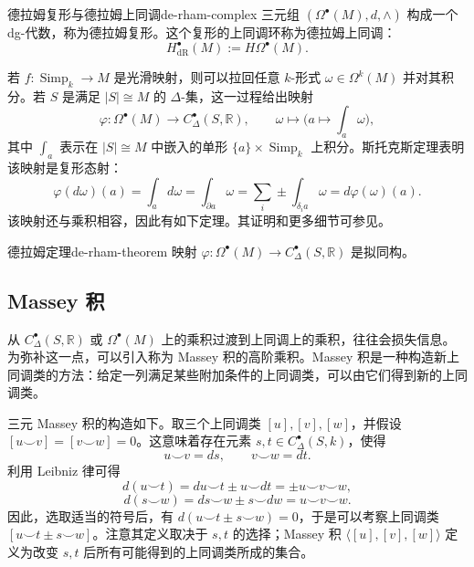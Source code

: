 \begin{definition}{德拉姆复形与德拉姆上同调}{de-rham-complex}
三元组 $(\Omega^\bullet(M),d,\wedge)$ 构成一个 dg-代数，称为德拉姆复形。这个复形的上同调环称为德拉姆上同调：
\[
  H_{\mathrm{dR}}^\bullet(M):=H\Omega^\bullet(M).
\]
\end{definition}
若 $f\colon\operatorname{Simp}_k\to M$ 是光滑映射，则可以拉回任意 $k$-形式 $\omega\in\Omega^k(M)$ 并对其积分。若 $S$ 是满足 $|S|\cong M$ 的 $\Delta$-集，这一过程给出映射
\[
  \varphi\colon\Omega^\bullet(M)\longrightarrow C_\Delta^\bullet(S,\mathbb R),
  \qquad \omega\longmapsto\bigl(a\longmapsto\int_a\omega\bigr),
\]
其中 $\int_a$ 表示在 $|S|\cong M$ 中嵌入的单形 $\{a\}\times\operatorname{Simp}_k$ 上积分。斯托克斯定理表明该映射是复形态射：
\[
  \varphi(d\omega)(a)=\int_a d\omega
  =\int_{\partial a}\omega
  =\sum_i\pm\int_{\delta_i a}\omega
  =d\varphi(\omega)(a).
\]
该映射还与乘积相容，因此有如下定理。其证明和更多细节可参见。

\begin{theorem}{德拉姆定理}{de-rham-theorem}
映射 $\varphi\colon\Omega^\bullet(M)\to C_\Delta^\bullet(S,\mathbb R)$ 是拟同构。
\end{theorem}

\subsection{Massey 积}\label{subsec:massey-products}
从 $C_\Delta^\bullet(S,\mathbb R)$ 或 $\Omega^\bullet(M)$ 上的乘积过渡到上同调上的乘积，往往会损失信息。为弥补这一点，可以引入称为 Massey 积的高阶乘积。Massey 积是一种构造新上同调类的方法：给定一列满足某些附加条件的上同调类，可以由它们得到新的上同调类。

三元 Massey 积的构造如下。取三个上同调类 $[u],[v],[w]$，并假设 $[u\smile v]=[v\smile w]=0$。这意味着存在元素 $s,t\in C_\Delta^\bullet(S,k)$，使得
\[
  u\smile v=ds,\qquad v\smile w=dt.
\]
利用 Leibniz 律可得
\[
  d(u\smile t)=du\smile t\pm u\smile dt=\pm u\smile v\smile w,
\]
\[
  d(s\smile w)=ds\smile w\pm s\smile dw=u\smile v\smile w.
\]
因此，选取适当的符号后，有 $d(u\smile t\pm s\smile w)=0$，于是可以考察上同调类 $[u\smile t\pm s\smile w]$。注意其定义取决于 $s,t$ 的选择；Massey 积 $\langle[u],[v],[w]\rangle$ 定义为改变 $s,t$ 后所有可能得到的上同调类所成的集合。


